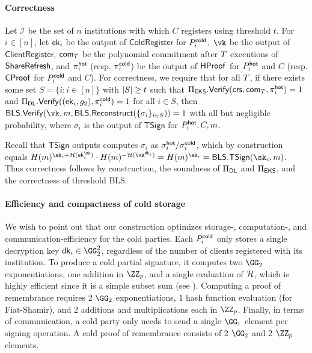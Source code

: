 \paragraph{Correctness}
Let $\mathcal{I}$ be the set of $n$ institutions with which $C$ registers using threshold $t$. For $i \in [n]$, let $\mathsf{ek}_i$ be the output of $\mathsf{ColdRegister}$ for $P_i^{\mathsf{cold}}$, $\vk$ be the output of $\mathsf{ClientRegister}$, $\mathsf{com}_{T}$ be the polynomial commitment after $T$ executions of $\mathsf{ShareRefresh}$, and $\pi_i^{\mathsf{hot}}$ (resp. $\pi_i^{\mathsf{cold}}$) be the output of $\mathsf{HProof}$ for $P_i^{\mathsf{hot}}$ and $C$ (resp. $\mathsf{CProof}$ for $P_i^{\mathsf{cold}}$ and $C$).
For correctness, we require that for all $T$, if there exists some set $S = \{i: i \in [n]\}$ with $\lvert S \rvert \geq t$ such that $\Pi_{\sf EKS}.{\mathsf{Verify}}(\mathsf{crs}, \mathsf{com}_{T},\allowbreak \pi_i^{\mathsf{hot}}) = 1$ and $\Pi_{\sf DL}.{\mathsf{Verify}}((\mathsf{ek}_i, g_2), \pi_i^{\mathsf{cold}}) = 1$ for all $i \in S$,
then $\mathsf{BLS}.\vrfy(\vk,\allowbreak m, \mathsf{BLS}.\recon(\{\sigma_i\}_{i \in S})) = 1$ with all but negligible probability, where $\sigma_i$ is the output of $\mathsf{TSign}$ for $P_i^{\mathsf{hot}}, C, m$.

Recall that $\mathsf{TSign}$ outputs computes $\sigma_i$ as $\sigma_i^{\mathsf{hot}}/\sigma_i^{\mathsf{cold}}$, which by construction equals $\blshash(m)^{\sk_i + \lhlhash(\ek_i^{\sk})} \cdot \blshash(m)^{-\lhlhash(\vk^{\dk_i})} = \blshash(m)^{\sk_i} = \mathsf{BLS}.\mathsf{TSign}(\sk_i, m)$. Thus correctness follows by construction, the soundness of $\Pi_{\sf DL}$ and $\Pi_{\sf EKS}$, and the correctness of threshold BLS.

\paragraph{Efficiency and compactness of cold storage}
We wish to point out that our construction optimizes storage-, computation-, and communication-efficiency for the cold parties. Each $P_i^{\mathsf{cold}}$ only stores a single decryption key $\dk_i \in \GG_2^2$, regardless of the number of clients registered with its institution. To produce a cold partial signature, it computes two $\GG_2$ exponentiations, one addition in $\ZZ_p$, and a single evaluation of $\mathcal{H}$, which is highly efficient since it is a simple subset sum (see ). Computing a proof of remembrance requires 2 $\GG_2$ exponentiations, 1 hash function evaluation (for Fiat-Shamir), and 2 additions and multiplications each in $\ZZ_p$. Finally, in terms of communication, a cold party only needs to send a single $\GG_1$ element per signing operation. A cold proof of remembrance consists of 2 $\GG_2$ and 2 $\ZZ_p$ elements.
